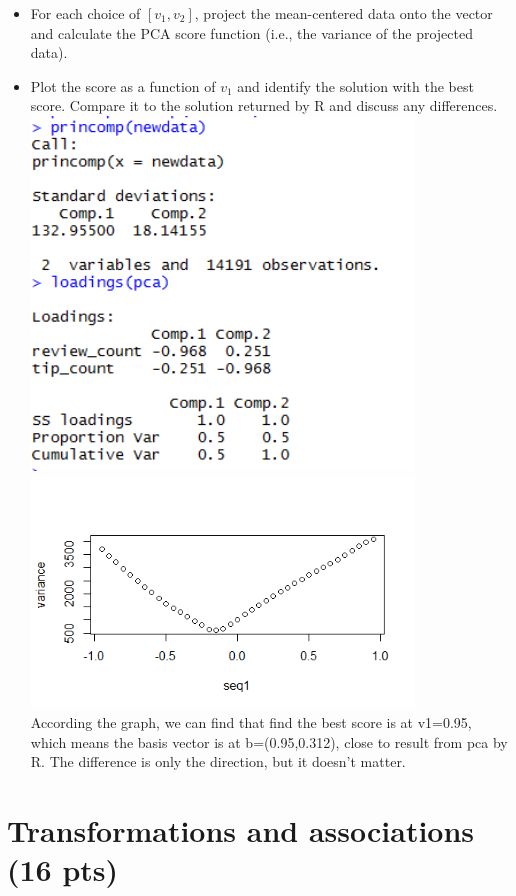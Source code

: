 \documentclass[11pt]{article}
\begin{document}
\begin{enumerate}[(a)]
\begin{itemize}
\item For each choice of $[v_1, v_2]$, project the mean-centered data onto the vector and calculate the PCA score function (i.e., the variance of the projected data). 
\item Plot the score as a function of $v_1$ and identify the solution with the best score. Compare it to the solution returned by R and discuss any differences.\\
\includegraphics[width=4in]{score.png}\\
\includegraphics[width=4in]{basisvector.png}\\

According the graph, we can find that find the best score is at v1=0.95, which means the basis vector is at b=(0.95,0.312), close to result from pca by R. The difference is only the direction, but it doesn't matter. 

\end{itemize}
\end{enumerate}


\section{Transformations and associations (16 pts)} 
\end{document}
